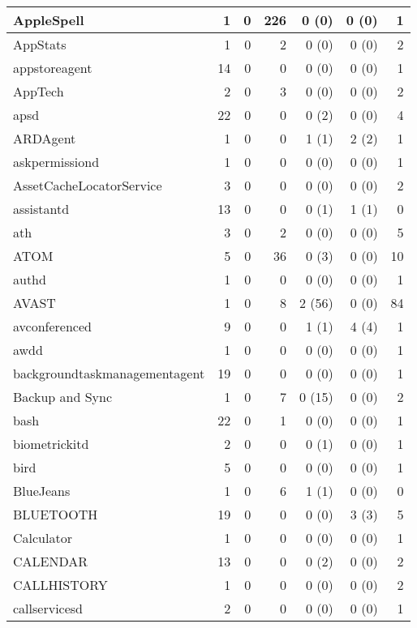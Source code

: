 \begin{adjustwidth}{-2in}{}
\begin{scriptsize}
\begin{longtable}[l]{ l | r | r | r | r | r | r }
    AppleSpell & 1 &  0 &  226 &  0 (0) &  0 (0) &  1 \\ \hline
    AppStats & 1 &  0 &  2 &  0 (0) &  0 (0) &  2 \\ \hline
    appstoreagent & 14 &  0 &  0 &  0 (0) &  0 (0) &  1 \\ \hline
    AppTech &  2 &  0 &  3 &  0 (0) &  0 (0) &  2 \\ \hline
    apsd &  22 &  0 &  0 &  0 (2) &  0 (0) &  4 \\ \hline
    ARDAgent & 1 &  0 &  0 &  1 (1) &  2 (2) &  1 \\ \hline
    askpermissiond & 1 &  0 &  0 &  0 (0) &  0 (0) &  1 \\ \hline
    AssetCacheLocatorService & 3 &  0 &  0 &  0 (0) &  0 (0) &  2 \\ \hline
    assistantd &  13 &  0 &  0 &  0 (1) &  1 (1) &  0 \\ \hline
    ath &  3 &  0 &  2 &  0 (0) &  0 (0) &  5 \\ \hline
    ATOM & 5 &  0 & 36 &  0 (3) &  0 (0) & 10 \\ \hline
    authd &  1 &  0 &  0 &  0 (0) &  0 (0) &  1 \\ \hline
    AVAST &  1 &  0 &  8 & 2 (56) &  0 (0) & 84 \\ \hline
    avconferenced &  9 &  0 &  0 &  1 (1) &  4 (4) &  1 \\ \hline
    awdd & 1 &  0 &  0 &  0 (0) &  0 (0) &  1 \\ \hline
    backgroundtaskmanagementagent & 19 &  0 &  0 &  0 (0) &  0 (0) &  1 \\ \hline
    Backup and Sync &  1 &  0 &  7 & 0 (15) &  0 (0) &  2 \\ \hline
    bash &  22 &  0 &  1 &  0 (0) &  0 (0) &  1 \\ \hline
    biometrickitd &  2 &  0 &  0 &  0 (1) &  0 (0) &  1 \\ \hline
    bird & 5 &  0 &  0 &  0 (0) &  0 (0) &  1 \\ \hline
    BlueJeans &  1 &  0 &  6 &  1 (1) &  0 (0) &  0 \\ \hline
    BLUETOOTH & 19 &  0 &  0 &  0 (0) &  3 (3) &  5 \\ \hline
    Calculator & 1 &  0 &  0 &  0 (0) &  0 (0) &  1 \\ \hline
    CALENDAR &  13 &  0 &  0 &  0 (2) &  0 (0) &  2 \\ \hline
    CALLHISTORY &  1 &  0 &  0 &  0 (0) &  0 (0) &  2 \\ \hline
    callservicesd &  2 &  0 &  0 &  0 (0) &  0 (0) &  1 \\ \hline

\end{longtable}
\end{scriptsize}
\end{adjustwidth}
